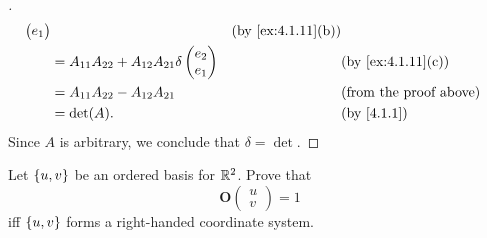 \begin{proof}[]
\begin{align*}
\begin{pmatrix}
                                                                                e_1
                                                                              \end{pmatrix}     &  & \text{(by \cref{ex:4.1.11}(b))}        \\
              & = A_{1 1} A_{2 2} + A_{1 2} A_{2 1} \delta\begin{pmatrix}
                                                            e_2 \\
                                                            e_1
                                                          \end{pmatrix} &  & \text{(by \cref{ex:4.1.11}(c))}                                \\
              & = A_{1 1} A_{2 2} - A_{1 2} A_{2 1}                       &  & \text{(from the proof above)}                                \\
              & = \det(A).                                                &  & \text{(by \cref{4.1.1})}
  \end{align*}
  Since \(A\) is arbitrary, we conclude that \(\delta = \det\).
\end{proof}

\begin{ex}\label{ex:4.1.12}
  Let \(\left\lbrace u, v\right\rbrace\) be an ordered basis for \(\mathbb{R}^2\).
  Prove that
  \[
    \mathbf{O}\begin{pmatrix}
      u \\
      v
    \end{pmatrix} = 1
  \]
  iff \(\left\lbrace u, v\right\rbrace\) forms a right-handed coordinate system.
\end{ex}

